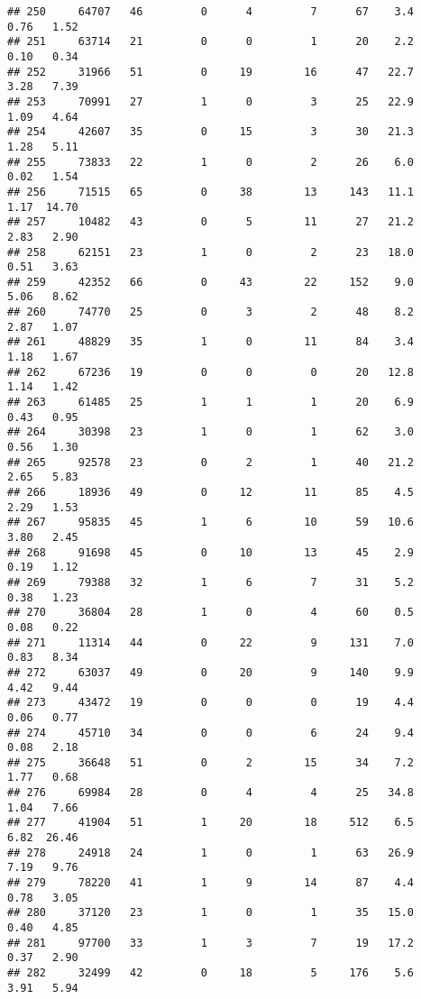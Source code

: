 \documentclass[
]{article}
\begin{document}
\begin{verbatim}
## 250     64707   46         0      4         7      67    3.4    0.76   1.52
## 251     63714   21         0      0         1      20    2.2    0.10   0.34
## 252     31966   51         0     19        16      47   22.7    3.28   7.39
## 253     70991   27         1      0         3      25   22.9    1.09   4.64
## 254     42607   35         0     15         3      30   21.3    1.28   5.11
## 255     73833   22         1      0         2      26    6.0    0.02   1.54
## 256     71515   65         0     38        13     143   11.1    1.17  14.70
## 257     10482   43         0      5        11      27   21.2    2.83   2.90
## 258     62151   23         1      0         2      23   18.0    0.51   3.63
## 259     42352   66         0     43        22     152    9.0    5.06   8.62
## 260     74770   25         0      3         2      48    8.2    2.87   1.07
## 261     48829   35         1      0        11      84    3.4    1.18   1.67
## 262     67236   19         0      0         0      20   12.8    1.14   1.42
## 263     61485   25         1      1         1      20    6.9    0.43   0.95
## 264     30398   23         1      0         1      62    3.0    0.56   1.30
## 265     92578   23         0      2         1      40   21.2    2.65   5.83
## 266     18936   49         0     12        11      85    4.5    2.29   1.53
## 267     95835   45         1      6        10      59   10.6    3.80   2.45
## 268     91698   45         0     10        13      45    2.9    0.19   1.12
## 269     79388   32         1      6         7      31    5.2    0.38   1.23
## 270     36804   28         1      0         4      60    0.5    0.08   0.22
## 271     11314   44         0     22         9     131    7.0    0.83   8.34
## 272     63037   49         0     20         9     140    9.9    4.42   9.44
## 273     43472   19         0      0         0      19    4.4    0.06   0.77
## 274     45710   34         0      0         6      24    9.4    0.08   2.18
## 275     36648   51         0      2        15      34    7.2    1.77   0.68
## 276     69984   28         0      4         4      25   34.8    1.04   7.66
## 277     41904   51         1     20        18     512    6.5    6.82  26.46
## 278     24918   24         1      0         1      63   26.9    7.19   9.76
## 279     78220   41         1      9        14      87    4.4    0.78   3.05
## 280     37120   23         1      0         1      35   15.0    0.40   4.85
## 281     97700   33         1      3         7      19   17.2    0.37   2.90
## 282     32499   42         0     18         5     176    5.6    3.91   5.94

\end{verbatim}
\end{document}
